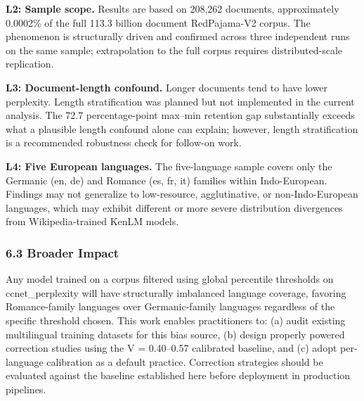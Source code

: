 \textbf{L2: Sample scope.} Results are based on 208,262 documents, approximately 0.0002\% of the full 113.3 billion document RedPajama-V2 corpus. The phenomenon is structurally driven and confirmed across three independent runs on the same sample; extrapolation to the full corpus requires distributed-scale replication.

\textbf{L3: Document-length confound.} Longer documents tend to have lower perplexity. Length stratification was planned but not implemented in the current analysis. The 72.7 percentage-point max--min retention gap substantially exceeds what a plausible length confound alone can explain; however, length stratification is a recommended robustness check for follow-on work.

\textbf{L4: Five European languages.} The five-language sample covers only the Germanic (en, de) and Romance (es, fr, it) families within Indo-European. Findings may not generalize to low-resource, agglutinative, or non-Indo-European languages, which may exhibit different or more severe distribution divergences from Wikipedia-trained KenLM models.

\subsubsection{6.3 Broader Impact}

Any model trained on a corpus filtered using global percentile thresholds on ccnet\_perplexity will have structurally imbalanced language coverage, favoring Romance-family languages over Germanic-family languages regardless of the specific threshold chosen. This work enables practitioners to: (a) audit existing multilingual training datasets for this bias source, (b) design properly powered correction studies using the V = 0.40--0.57 calibrated baseline, and (c) adopt per-language calibration as a default practice. Correction strategies should be evaluated against the baseline established here before deployment in production pipelines.


